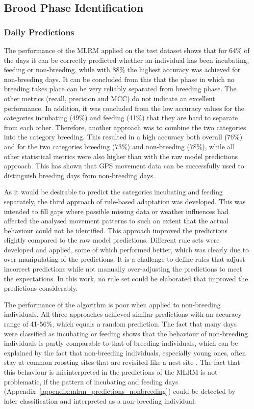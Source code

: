 \subsection{Brood Phase Identification}
\subsubsection{Daily Predictions}
The performance of the MLRM applied on the test dataset shows that for 64\% of the days it can be correctly predicted whether an individual has been incubating, feeding or non-breeding, while with 88\% the highest accuracy was achieved for non-breeding days. It can be concluded from this that the phase in which no breeding takes place can be very reliably separated from breeding phase. The other metrics (recall, precision and MCC) do not indicate an excellent performance. In addition, it was concluded from the low accuracy values for the categories incubating (49\%) and feeding (41\%) that they are hard to separate from each other. Therefore, another approach was to combine the two categories into the category breeding. This resulted in a high accuracy both overall (76\%) and for the two categories breeding (73\%) and non-breeding (78\%), while all other statistical metrics were also higher than with the raw model predictions approach. This has shown that GPS movement data can be successfully used to distinguish breeding days from non-breeding days.

As it would be desirable to predict the categories incubating and feeding separately, the third approach of rule-based adaptation was developed. This was intended to fill gaps where possible missing data or weather influences had affected the analysed movement patterns to such an extent that the actual behaviour could not be identified. This approach improved the predictions slightly compared to the raw model predictions. Different rule sets were developed and applied, some of which performed better, which was clearly due to over-manipulating of the predictions. It is a challenge to define rules that adjust incorrect predictions while not manually over-adjusting the predictions to meet the expectations. In this work, no rule set could be elaborated that improved the predictions considerably.

The performance of the algorithm is poor when applied to non-breeding individuals. All three approaches achieved similar predictions with an accuracy range of 41-56\%, which equals a random prediction. The fact that many days were classified as incubating or feeding shows that the behaviour of non-breeding individuals is partly comparable to that of breeding individuals, which can be explained by the fact that non-breeding individuals, especially young ones, often stay at common roosting sites that are revisited like a nest site \parencite{aebischer2021rotmilan}. The fact that this behaviour is misinterpreted in the predictions of the MLRM is not problematic, if the pattern of incubating and feeding days (Appendix~\ref{appendix:mlrm_predictions_nonbreeding}) could be detected by later classification and interpreted as a non-breeding individual.

